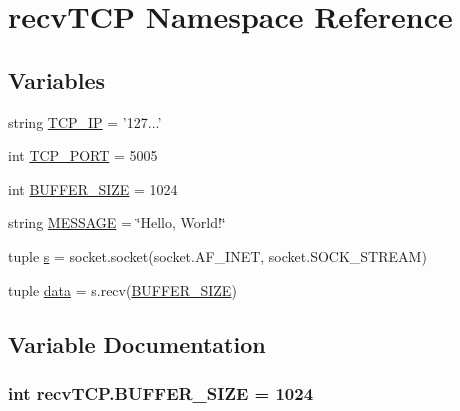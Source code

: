\hypertarget{namespacerecvTCP}{}\section{recv\+T\+C\+P Namespace Reference}
\label{namespacerecvTCP}
\subsection*{Variables}
\begin{DoxyCompactItemize}
\item 
string \hyperlink{namespacerecvTCP_aa3be6842108a875b8df9a713e7b360b7}{T\+C\+P\+\_\+\+I\+P} = '127...'
\item 
int \hyperlink{namespacerecvTCP_a65987d0f95cb5a729ceb73f1cac6ed28}{T\+C\+P\+\_\+\+P\+O\+R\+T} = 5005
\item 
int \hyperlink{namespacerecvTCP_ac3135d1ab2d4197ad648359975db84fb}{B\+U\+F\+F\+E\+R\+\_\+\+S\+I\+Z\+E} = 1024
\item 
string \hyperlink{namespacerecvTCP_a27413dbbf510167047e66d7ac74f8dcd}{M\+E\+S\+S\+A\+G\+E} = \char`\"{}Hello, World!\char`\"{}
\item 
tuple \hyperlink{namespacerecvTCP_ac7cccc8bf562ba5f52c30b9cb307c314}{s} = socket.\+socket(socket.\+A\+F\+\_\+\+I\+N\+E\+T, socket.\+S\+O\+C\+K\+\_\+\+S\+T\+R\+E\+A\+M)
\item 
tuple \hyperlink{namespacerecvTCP_a0e0f0e6192ae60f55f3d0ae1dc030b34}{data} = s.\+recv(\hyperlink{namespacerecvTCP_ac3135d1ab2d4197ad648359975db84fb}{B\+U\+F\+F\+E\+R\+\_\+\+S\+I\+Z\+E})
\end{DoxyCompactItemize}


\subsection{Variable Documentation}
\hypertarget{namespacerecvTCP_ac3135d1ab2d4197ad648359975db84fb}{}
\subsubsection[{B\+U\+F\+F\+E\+R\+\_\+\+S\+I\+Z\+E}]{\setlength{\rightskip}{0pt plus 5cm}int recv\+T\+C\+P.\+B\+U\+F\+F\+E\+R\+\_\+\+S\+I\+Z\+E = 1024}\label{namespacerecvTCP_ac3135d1ab2d4197ad648359975db84fb}
\hypertarget{namespacerecvTCP_a0e0f0e6192ae60f55f3d0ae1dc030b34}{}
